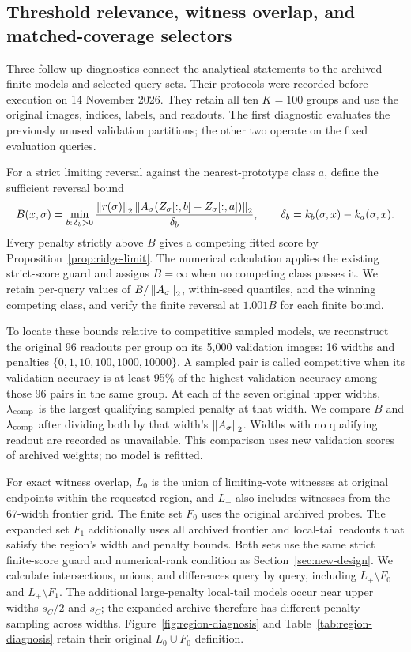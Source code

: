 \subsection{Threshold relevance, witness overlap, and matched-coverage selectors}
\label{sec:r3-design}
Three follow-up diagnostics connect the analytical statements to the archived finite models and selected query sets. Their protocols were recorded before execution on 14 November 2026. They retain all ten $K=100$ groups and use the original images, indices, labels, and readouts. The first diagnostic evaluates the previously unused validation partitions; the other two operate on the fixed evaluation queries.

For a strict limiting reversal against the nearest-prototype class $a$, define the sufficient reversal bound
\[
 B(x,\sigma)=\min_{b:\,\delta_b>0}
 \frac{\left\lVert r(\sigma)\right\rVert_2\left\lVert A_\sigma(Z_\sigma[:,b]-Z_\sigma[:,a])\right\rVert_2}{\delta_b},
 \qquad \delta_b=k_b(\sigma,x)-k_a(\sigma,x).
\]
Every penalty strictly above $B$ gives a competing fitted score by Proposition~\ref{prop:ridge-limit}. The numerical calculation applies the existing strict-score guard and assigns $B=\infty$ when no competing class passes it. We retain per-query values of $B/\left\lVert A_\sigma\right\rVert_2$, within-seed quantiles, and the winning competing class, and verify the finite reversal at $1.001B$ for each finite bound.

To locate these bounds relative to competitive sampled models, we reconstruct the original 96 readouts per group on its 5,000 validation images: 16 widths and penalties $\{0,1,10,100,1000,10000\}$. A sampled pair is called competitive when its validation accuracy is at least 95\% of the highest validation accuracy among those 96 pairs in the same group. At each of the seven original upper widths, $\lambda_{\rm comp}$ is the largest qualifying sampled penalty at that width. We compare $B$ and $\lambda_{\rm comp}$ after dividing both by that width's $\left\lVert A_\sigma\right\rVert_2$. Widths with no qualifying readout are recorded as unavailable. This comparison uses new validation scores of archived weights; no model is refitted.

For exact witness overlap, $L_0$ is the union of limiting-vote witnesses at original endpoints within the requested region, and $L_+$ also includes witnesses from the 67-width frontier grid. The finite set $F_0$ uses the original archived probes. The expanded set $F_1$ additionally uses all archived frontier and local-tail readouts that satisfy the region's width and penalty bounds. Both sets use the same strict finite-score guard and numerical-rank condition as Section~\ref{sec:new-design}. We calculate intersections, unions, and differences query by query, including $L_+\setminus F_0$ and $L_+\setminus F_1$. The additional large-penalty local-tail models occur near upper widths $s_C/2$ and $s_C$; the expanded archive therefore has different penalty sampling across widths. Figure~\ref{fig:region-diagnosis} and Table~\ref{tab:region-diagnosis} retain their original $L_0\cup F_0$ definition.

